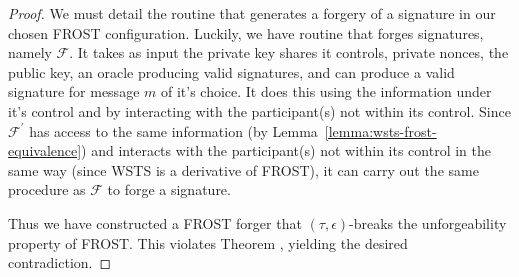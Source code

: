 \documentclass{article}
\begin{document}
\begin{proof}
We must detail the routine that generates a forgery of a signature in our chosen FROST configuration. Luckily, we have routine that forges signatures, namely $\mathcal{F}$. It takes as input the private key shares it controls, private nonces, the public key, an oracle producing valid signatures, and can produce a valid signature for message $m$ of it's choice. It does this using the information under it's control and by interacting with the participant(s) not within its control. Since $\mathcal{F}^\prime$ has access to the same information (by Lemma~\ref{lemma:wsts-frost-equivalence}) and interacts with the participant(s) not within its control in the same way (since WSTS is a derivative of FROST), it can carry out the same procedure as $\mathcal{F}$ to forge a signature.

Thus we have constructed a FROST forger that $(\tau, \epsilon)$-breaks the unforgeability property of FROST. This violates Theorem \cite[\S A.2]{frost:2020}, yielding the desired contradiction.
\end{proof}
\end{document}

